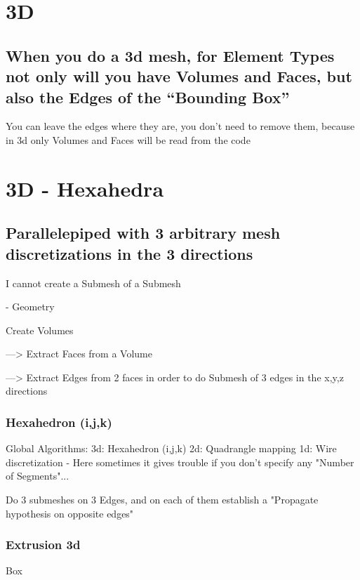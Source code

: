 \documentclass[10pt]{book}
\begin{document}
\section{3D}


\subsection{When you do a 3d mesh, for Element Types not only will you have Volumes and Faces, but also the Edges of the ``Bounding Box''}

  You can leave the edges where they are, 
  you don't need to remove them,
  because in 3d only Volumes and Faces will be read from the code
 


\section{3D - Hexahedra}


 \subsection{Parallelepiped with 3 arbitrary mesh discretizations in the 3 directions}

I cannot create a Submesh of a Submesh

- Geometry

  Create Volumes
  
    ---> Extract Faces from a Volume
    
    ---> Extract Edges from 2 faces in order to do Submesh of 3 edges in the x,y,z directions

    
    \subsubsection{Hexahedron (i,j,k)}
    
   Global Algorithms:
    3d: Hexahedron (i,j,k)
    2d: Quadrangle mapping
    1d: Wire discretization  - Here sometimes it gives trouble if you don't specify any "Number of Segments"...
    
    Do 3 submeshes on 3 Edges, and on each of them establish a "Propagate hypothesis on opposite edges"
   
    
  \subsubsection{Extrusion 3d}
  
  
  Box
  
\end{document}
